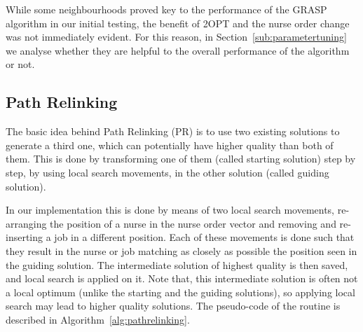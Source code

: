 \documentclass[a4paper,11pt,authoryear]{elsarticle}
\begin{document}
\noindent While some neighbourhoods proved key to the performance of the GRASP algorithm in our initial testing, the benefit of 2OPT and the nurse order change was not immediately evident. For this reason, in Section~\ref{sub:parametertuning} we analyse whether they are helpful to the overall performance of the algorithm or not.

\subsection{Path Relinking}
\label{sub:pathrelinking}
\noindent The basic idea behind Path Relinking (PR) \citep{laguna1999,resende2016} is to use two existing solutions to generate a third one, which can potentially have higher quality than both of them.
This is done by transforming one of them (called starting solution) step by step, by using local search movements, in the other solution (called guiding solution).

In our implementation this is done by means of two local search movements, re-arranging the position of a nurse in the nurse order vector and removing and re-inserting a job in a different position. Each of these movements is done such that they result in the nurse or job matching as closely as possible the position seen in the guiding solution. The intermediate solution of highest quality is then saved, and local search is applied on it. Note that, this intermediate solution is often not a local optimum (unlike the starting and the guiding solutions), so applying local search may lead to higher quality solutions. The pseudo-code of the routine is described in Algorithm~\ref{alg:pathrelinking}.
\end{document}
